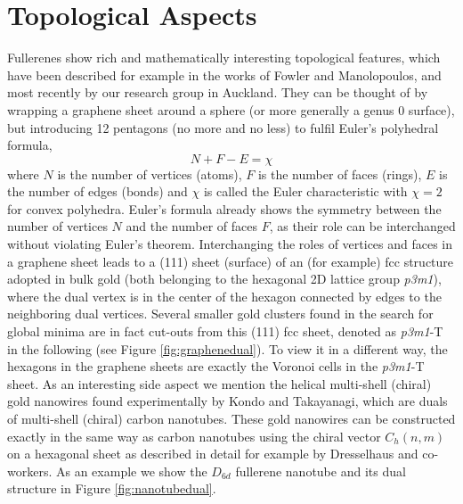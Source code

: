 \section{\label{sec:TopAsp}Topological Aspects}

Fullerenes show rich and mathematically interesting topological features\autocite{Cataldo-Ori-2011,Schwerdtfeger_topologyfullerenes_2015}, which have been described for example in the works of Fowler and Manolopoulos\autocite{Fowler-atlas-2006}, and most recently by our research group in Auckland.\autocite{Schwerdtfeger_topologyfullerenes_2015} They can be thought of by wrapping a graphene sheet around a sphere (or more generally a genus 0 surface), but introducing 12 pentagons (no more and no less) to fulfil Euler's polyhedral formula, 
\begin{equation}
  \label{eq:euler} 
  N + F -E = \chi 
\end{equation}
where $N$ is the number of vertices (atoms), $F$ is the number of faces (rings), $E$ is the number of edges (bonds)
and $\chi$ is called the Euler characteristic with $\chi=2$ for convex polyhedra.\autocite{Kotschick_TopologyCombinatoricsSoccer_2006} Euler's formula already shows the symmetry between the number of vertices $N$ and the number of faces $F$, as their role can be interchanged without violating Euler's theorem. Interchanging the roles of vertices and faces in a graphene sheet leads to a (111) sheet (surface) of an (for example) fcc structure adopted in bulk gold (both belonging to the hexagonal 2D lattice group {\it p3m1}), where the dual vertex is in the center of the hexagon connected by edges to the neighboring dual vertices. Several smaller gold clusters found in the search for global minima are in fact cut-outs from this (111) fcc sheet,\autocite{Assadollahzadeh_systematicsearchminimum_2009} denoted as {\it p3m1}-T in the following (see Figure \ref{fig:graphenedual}). To view it in a different way, the hexagons in the graphene sheets are exactly the Voronoi cells in the {\it p3m1}-T sheet. As an interesting side aspect we mention the helical multi-shell (chiral) gold nanowires found experimentally by Kondo and Takayanagi,\autocite{Kondo-2000} which are duals of multi-shell (chiral) carbon nanotubes.\autocite{Johansson_Au3224CaratGolden_2004} These gold nanowires can be constructed exactly in the same way as carbon nanotubes using the chiral vector $C_h(n,m)$ on a hexagonal sheet as described in detail for example by Dresselhaus and co-workers.\autocite{Dresselhaus-1992} As an example we show the $D_{6d}$ fullerene nanotube and its dual structure in Figure \ref{fig:nanotubedual}.


